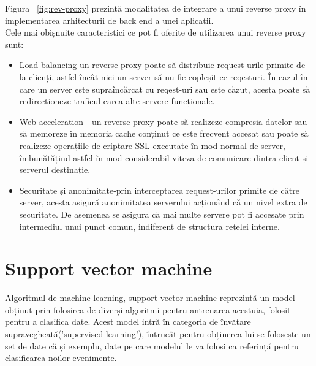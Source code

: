 Figura ~\ref{fig:rev-proxy} prezintă modalitatea de integrare a unui reverse proxy în implementarea arhitecturii de back end a unei aplicații. \\

Cele mai obișnuite caracteristici ce pot fi oferite de utilizarea unui reverse proxy sunt: 
\begin{itemize}
	\item Load balancing-un reverse proxy poate să distribuie request-urile primite de la clienți, astfel încât nici un server să nu fie copleșit ce reqesturi. În cazul în care un server este supraîncărcat cu reqest-uri sau este căzut, acesta poate să redirectioneze traficul carea alte servere funcționale. 
	\item Web acceleration - un reverse proxy poate să realizeze compresia datelor sau să memoreze în memoria cache conținut ce este frecvent accesat sau poate să realizeze operațiile de criptare SSL executate în mod normal de server, îmbunătățind astfel în mod considerabil viteza de comunicare dintra client și serverul destinație. 
	\item  Securitate și anonimitate-prin interceptarea request-urilor primite de către server, acesta asigură anonimitatea serverului acționând că un nivel extra de securitate. De asemenea se asigură că mai multe servere pot fi accesate prin intermediul unui punct comun, indiferent de structura rețelei interne. 
\end{itemize}



\section{Support vector machine}

Algoritmul de machine learning, support vector machine reprezintă un model obținut prin folosirea de diverși algoritmi pentru antrenarea acestuia, folosit pentru a clasifica date. Acest model intră în categoria de învățare supravegheată('supervised learning'), întrucât pentru obținerea lui se folosește un set de date că și exemplu, date pe care modelul le va folosi ca referință pentru clasificarea noilor evenimente. 
  
